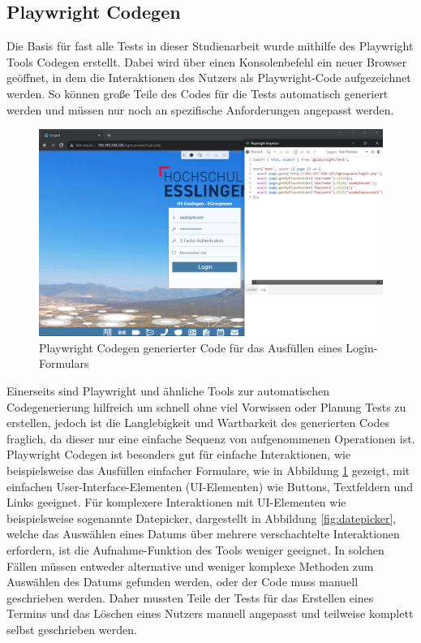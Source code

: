\subsection*{Playwright Codegen}

Die Basis für fast alle Tests in dieser Studienarbeit wurde mithilfe des Playwright Tools Codegen erstellt.
Dabei wird über einen Konsolenbefehl ein neuer Browser geöffnet, in dem die Interaktionen des Nutzers als Playwright-Code aufgezeichnet werden.
So können große Teile des Codes für die Tests automatisch generiert werden und müssen nur noch an spezifische Anforderungen angepasst werden.
\begin{figure}[H]
    \centering
    \includegraphics[width=1\textwidth]{images/Playwright_Codegen.png}
    \caption{Playwright Codegen generierter Code für das Ausfüllen eines Login-Formulars}
    \label{fig:playwright-codegen}
\end{figure}

Einerseits sind Playwright und ähnliche Tools zur automatischen Codegenerierung hilfreich um schnell ohne viel Vorwissen oder Planung Tests zu erstellen, jedoch ist die Langlebigkeit und Wartbarkeit des generierten Codes fraglich, da dieser nur eine \glqq einfache Sequenz von aufgenommenen Operationen \grqq \autocite[][294]{automating-e2e-manual} ist.
Playwright Codegen ist besonders gut für einfache Interaktionen, wie beispielsweise das Ausfüllen einfacher Formulare, wie in Abbildung \ref{fig:playwright-codegen} gezeigt, mit einfachen User-Interface-Elementen (UI-Elementen) wie Buttons, Textfeldern und Links geeignet.
Für komplexere Interaktionen mit UI-Elementen wie beispielsweise sogenannte Datepicker, dargestellt in Abbildung \ref{fig:datepicker}, welche das Auswählen eines Datums über mehrere verschachtelte Interaktionen erfordern, ist die Aufnahme-Funktion des Tools weniger geeignet.
In solchen Fällen müssen entweder alternative und weniger komplexe Methoden zum Auswählen des Datums gefunden werden, oder der Code muss manuell geschrieben werden.
Daher mussten Teile der Tests für das Erstellen eines Termins und das Löschen eines Nutzers manuell angepasst und teilweise komplett selbst geschrieben werden.

